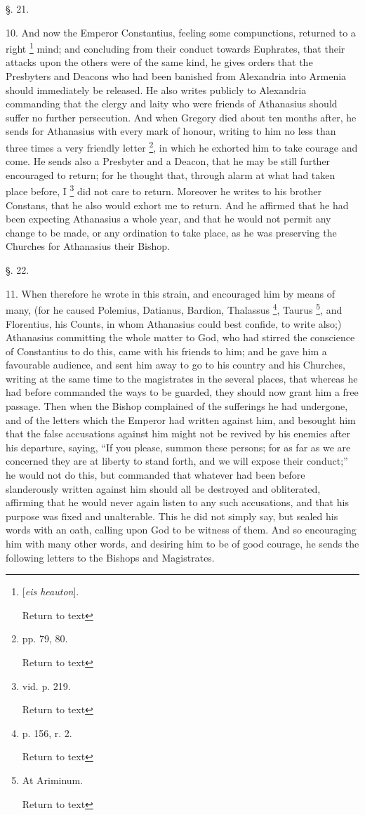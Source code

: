 §. 21.

10. And now the Emperor Constantius, feeling some
compunctions, returned to a right \footnote{[\emph{eis heauton}].

Return to text} mind; and concluding from their conduct towards Euphrates,
that their attacks upon the others were of the same kind, he gives
orders that the Presbyters and Deacons who had been banished from
Alexandria into Armenia should immediately be released. He also writes
publicly to Alexandria commanding that the clergy and laity who were
friends of Athanasius should suffer no further persecution. And when
Gregory died about ten months after, he sends for Athanasius with
every mark of honour, writing to him no less than three times a very
friendly letter \footnote{pp. 79, 80.

Return to text}, in
which he exhorted him to take courage and come. He sends also a
Presbyter and a Deacon, that he may be still further encouraged to
return; for he thought that, through alarm at what had taken place
before, I \footnote{vid. p. 219.

Return to text} did not
care to return. Moreover he writes to his brother Constans, that he
also would exhort me to return. And he affirmed that he had been
expecting Athanasius a whole year, and that he would not permit any
change to be made, or any ordination to take place, as he was
preserving the Churches for Athanasius their Bishop.

§. 22.

11. When therefore he wrote in this strain, and
encouraged him by means of many, (for he caused Polemius, Datianus,
Bardion, Thalassus \footnote{p. 156, r. 2.

Return to text},
Taurus \footnote{At Ariminum.

Return to text}, and
Florentius, his Counts, in whom Athanasius could best confide, to
write also;) Athanasius committing the whole matter to God, who had
stirred the conscience of Constantius to do this, came with his
friends to him; and he gave him a favourable audience, and sent him
away to go to his country and his Churches, writing at the same
time to the magistrates in the several places, that whereas he had
before commanded the ways to be guarded, they should now grant him a
free passage. Then when the Bishop complained of the sufferings he had
undergone, and of the letters which the Emperor had written against
him, and besought him that the false accusations against him might not
be revived by his enemies after his departure, saying, ``If you please,
summon these persons; for as far as we are concerned they are at
liberty to stand forth, and we will expose their conduct;'' he would
not do this, but commanded that whatever had been before slanderously
written against him should all be destroyed and obliterated, affirming
that he would never again listen to any such accusations, and that his
purpose was fixed and unalterable. This he did not simply say, but
sealed his words with an oath, calling upon God to be witness of them.
And so encouraging him with many other words, and desiring him to be
of good courage, he sends the following letters to the Bishops and
Magistrates.

